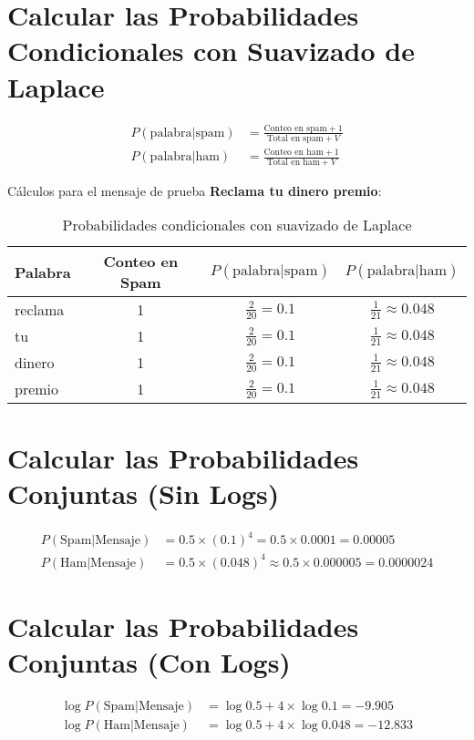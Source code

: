 \documentclass{article}
\begin{document}
\section{Calcular las Probabilidades Condicionales con Suavizado de Laplace}
\begin{align*}
P(\text{palabra|spam}) &= \frac{\text{Conteo en spam} + 1}{\text{Total en spam} + V} \\
P(\text{palabra|ham}) &= \frac{\text{Conteo en ham} + 1}{\text{Total en ham} + V}
\end{align*}

Cálculos para el mensaje de prueba \textbf{Reclama tu dinero premio}:
\begin{table}[h!]
\centering
\begin{tabular}{lccc}
\toprule
Palabra & Conteo en Spam & $P(\text{palabra|spam})$ & $P(\text{palabra|ham})$ \\
\midrule
reclama & 1 & $\frac{2}{20} = 0.1$ & $\frac{1}{21} \approx 0.048$ \\
tu & 1 & $\frac{2}{20} = 0.1$ & $\frac{1}{21} \approx 0.048$ \\
dinero & 1 & $\frac{2}{20} = 0.1$ & $\frac{1}{21} \approx 0.048$ \\
premio & 1 & $\frac{2}{20} = 0.1$ & $\frac{1}{21} \approx 0.048$ \\
\bottomrule
\end{tabular}
\caption{Probabilidades condicionales con suavizado de Laplace}
\end{table}

\section{Calcular las Probabilidades Conjuntas (Sin Logs)}
\begin{align*}
P(\text{Spam|Mensaje}) &= 0.5 \times (0.1)^4 = 0.5 \times 0.0001 = 0.00005 \\
P(\text{Ham|Mensaje}) &= 0.5 \times (0.048)^4 \approx 0.5 \times 0.000005 = 0.0000024
\end{align*}

\section{Calcular las Probabilidades Conjuntas (Con Logs)}
\begin{align*}
\log P(\text{Spam|Mensaje}) &= \log 0.5 + 4 \times \log 0.1 = -9.905 \\
\log P(\text{Ham|Mensaje}) &= \log 0.5 + 4 \times \log 0.048 = -12.833
\end{align*}
\end{document}
